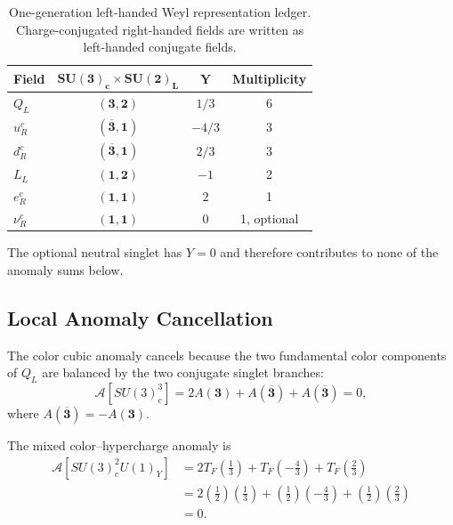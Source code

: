 \documentclass[11pt]{article}
\begin{document}
\begin{table}[htbp]
\centering
\caption{One-generation left-handed Weyl representation ledger.  Charge-conjugated right-handed fields are written as left-handed conjugate fields.}
\label{tab:priii-left-weyl-ledger}
\begin{tabular}{lccc}
\toprule
\textbf{Field} & \(\boldsymbol{SU(3)_c\times SU(2)_L}\) & \(\boldsymbol{Y}\) & \textbf{Multiplicity} \\
\midrule
\(Q_L\)        & \((\mathbf 3,\mathbf 2)\)                  & \(1/3\)  & 6 \\
\(u_R^c\)      & \((\overline{\mathbf 3},\mathbf 1)\)       & \(-4/3\) & 3 \\
\(d_R^c\)      & \((\overline{\mathbf 3},\mathbf 1)\)       & \(2/3\)  & 3 \\
\(L_L\)        & \((\mathbf 1,\mathbf 2)\)                  & \(-1\)   & 2 \\
\(e_R^c\)      & \((\mathbf 1,\mathbf 1)\)                  & \(2\)    & 1 \\
\(\nu_R^c\)    & \((\mathbf 1,\mathbf 1)\)                  & \(0\)    & 1, optional \\
\bottomrule
\end{tabular}
\end{table}

The optional neutral singlet has \(Y=0\) and therefore contributes to none of the anomaly sums below.

\subsection{Local Anomaly Cancellation}
\label{subsec:priii-local-anomaly-cancellation}

The color cubic anomaly cancels because the two fundamental color components of \(Q_L\) are balanced by the two conjugate singlet branches:
\begin{equation}
\mathcal A\!\left[SU(3)_c^3\right]
=
2A(\mathbf 3)
+
A(\overline{\mathbf 3})
+
A(\overline{\mathbf 3})
=
0,
\end{equation}
where \(A(\overline{\mathbf 3})=-A(\mathbf 3)\).

The mixed color--hypercharge anomaly is
\begin{align}
\mathcal A\!\left[SU(3)_c^2U(1)_Y\right]
&=
2T_F\left(\frac13\right)
+
T_F\left(-\frac43\right)
+
T_F\left(\frac23\right)
\nonumber\\
&=
2\left(\frac12\right)\left(\frac13\right)
+
\left(\frac12\right)\left(-\frac43\right)
+
\left(\frac12\right)\left(\frac23\right)
\nonumber\\
&=0.
\end{align}
\end{document}
